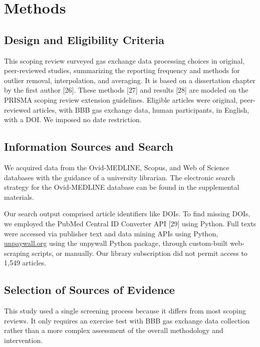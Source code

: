 \documentclass[
  letterpaper,
  DIV=11,
  numbers=noendperiod]{scrartcl}
\begin{document}
\section{Methods}\label{sec-methods}

\subsection{Design and Eligibility
Criteria}\label{design-and-eligibility-criteria}

This scoping review surveyed gas exchange data processing choices in
original, peer-reviewed studies, summarizing the reporting frequency and
methods for outlier removal, interpolation, and averaging. It is based
on a dissertation chapter by the first author {[}26{]}. These methods
{[}27{]} and results {[}28{]} are modeled on the PRISMA scoping review
extension guidelines. Eligible articles were original, peer-reviewed
articles, with BBB gas exchange data, human participants, in English,
with a DOI. We imposed no date restriction.

\subsection{Information Sources and
Search}\label{information-sources-and-search}

We acquired data from the Ovid-MEDLINE, Scopus, and Web of Science
databases with the guidance of a university librarian. The electronic
search strategy for the Ovid-MEDLINE database can be found in the
supplemental materials.

Our search output comprised article identifiers like DOIs. To find
missing DOIs, we employed the PubMed Central ID Converter API {[}29{]}
using Python. Full texts were accessed via publisher text and data
mining APIs using Python, \href{https://unpaywall.org/}{unpaywall.org}
using the unpywall Python package, through custom-built web-scraping
scripts, or manually. Our library subscription did not permit access to
1,549 articles.

\subsection{Selection of Sources of
Evidence}\label{selection-of-sources-of-evidence}

This study used a single screening process because it differs from most
scoping reviews. It only requires an exercise test with BBB gas exchange
data collection rather than a more complex assessment of the overall
methodology and intervention.
\end{document}
